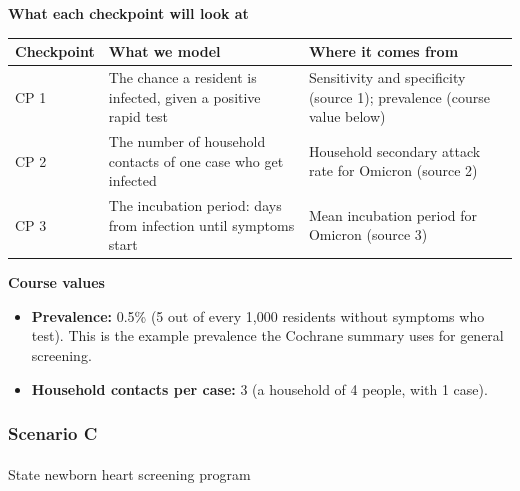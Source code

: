 \documentclass[
  letterpaper,
  DIV=11,
  numbers=noendperiod]{scrartcl}
\makeatletter
\let\oldparagraph\paragraph
\renewcommand{\paragraph}{
    \@ifstar
      \xxxParagraphStar
      \xxxParagraphNoStar
  }
\newcommand{\xxxParagraphStar}[1]{\oldparagraph*{#1}\mbox{}}
\newcommand{\xxxParagraphNoStar}[1]{\oldparagraph{#1}\mbox{}}
\newcounter{none} %
\providecommand{\tightlist}{%
  \setlength{\itemsep}{0pt}\setlength{\parskip}{0pt}}
\makeatother
\begin{document}
\textbf{What each checkpoint will look at}

{\def\LTcaptype{none} %
\begin{longtable}[]{@{}
  >{\raggedright\arraybackslash}p{}
  >{\raggedright\arraybackslash}p{}
  >{\raggedright\arraybackslash}p{}@{}}
\toprule\noalign{}
\begin{minipage}[b]{\linewidth}\raggedright
Checkpoint
\end{minipage} & \begin{minipage}[b]{\linewidth}\raggedright
What we model
\end{minipage} & \begin{minipage}[b]{\linewidth}\raggedright
Where it comes from
\end{minipage} \\
\midrule\noalign{}
\endhead
\bottomrule\noalign{}
\endlastfoot
CP 1 & The chance a resident is infected, given a positive rapid test &
Sensitivity and specificity (source 1); prevalence (course value
below) \\
CP 2 & The number of household contacts of one case who get infected &
Household secondary attack rate for Omicron (source 2) \\
CP 3 & The incubation period: days from infection until symptoms start &
Mean incubation period for Omicron (source 3) \\
\end{longtable}
}

\textbf{Course values}

\begin{itemize}
\tightlist
\item
  \textbf{Prevalence:} 0.5\% (5 out of every 1,000 residents without
  symptoms who test). This is the example prevalence the Cochrane
  summary uses for general screening.
\item
  \textbf{Household contacts per case:} 3 (a household of 4 people, with
  1 case).
\end{itemize}

\subsubsection{Scenario C}

\paragraph{State newborn heart screening
program}\label{state-newborn-heart-screening-program}
\end{document}
